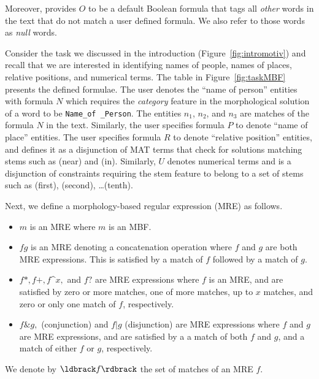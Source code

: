 Moreover, \framework provides $O$ to be a default Boolean formula that tags all {\em other} words in the text that do not match a user defined formula.
We also refer to those words as {\em null} words.



Consider the task we discussed in the introduction (Figure~\ref{fig:intromotiv}) 
and recall that we are interested in identifying names of people, names of places, relative positions, and numerical terms.
The table in Figure~\ref{fig:taskMBF} presents the defined formulae.
The user denotes the ``name of person'' entities with formula $N$ 
which requires the {\em category} feature in the morphological solution of a word to be {\tt Name\_of \_Person}.
The entities $n_1$, $n_2$, and $n_3$ are matches of the formula $N$ in the text.
Similarly, the user specifies formula $P$ to denote ``name of place'' entities. 
The user specifies formula $R$ to denote ``relative position'' entities, 
and defines it as a disjunction of MAT terms that check for 
solutions matching stems such as  (near) and  (in).
Similarly, $U$ denotes numerical terms and is a disjunction of constraints 
requiring the stem feature to belong to a set of stems such as
(first), (second), \dots {}(tenth).


Next, we define a morphology-based regular expression (MRE) as follows.
\begin{itemize}
\item $m$ is an MRE where $m$ is an MBF.
\item $fg$ is an MRE denoting a concatenation operation
  where $f$ and $g$ are both MRE expressions. This is 
  satisfied by a match of $f$ followed by a match of $g$. 
\item $f*,f+,f$\textasciicircum$x,$ and $f?$ are MRE expressions where $f$ is an MRE,
  and are satisfied by zero or more matches, one of more matches, up to $x$ matches, 
  and zero or only one match of $f$, respectively.
\item $f\& g,$ (conjunction) and $f|g$ (disjunction) are  MRE expressions where 
  $f$ and $g$ are MRE expressions, and are satisfied by a 
  a match of both $f$ and $g$, 
  and a match of either $f$ or $g$, respectively. 
\end{itemize}
We denote by $\ldbrack f\rdbrack$ the set of matches of an MRE $f$.

